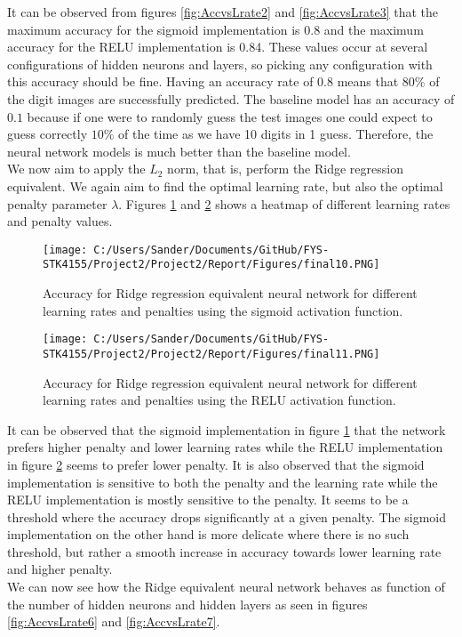 \documentclass[12pt,a4paper]{article}
\begin{document}
\noindent It can be observed from figures \ref{fig:AccvsLrate2} and \ref{fig:AccvsLrate3} that the maximum accuracy for the sigmoid implementation is 0.8 and the maximum accuracy for the RELU implementation is 0.84. These values occur at several configurations of hidden neurons and layers, so picking any configuration with this accuracy should be fine. Having an accuracy rate of 0.8 means that $80\%$ of the digit images are successfully predicted. The baseline model has an accuracy of $0.1$ because if one were to randomly guess the test images one could expect to guess correctly $10\%$ of the time as we have 10 digits in 1 guess. Therefore, the neural network models is much better than the baseline model.
\\
We now aim to apply the $L_2$ norm, that is, perform the Ridge regression equivalent. We again aim to find the optimal learning rate, but also the optimal penalty parameter $\lambda$. Figures \ref{fig:AccvsLrate4} and \ref{fig:AccvsLrate5} shows a heatmap of different learning rates and penalty values.

\begin{figure}[H]
\centering
\texttt{[image: C:/Users/Sander/Documents/GitHub/FYS-STK4155/Project2/Project2/Report/Figures/final10.PNG]}
\caption{\label{fig:AccvsLrate4} Accuracy for Ridge regression equivalent neural network for different learning rates and penalties using the sigmoid activation function.}
\end{figure}

\begin{figure}[H]
\centering
\texttt{[image: C:/Users/Sander/Documents/GitHub/FYS-STK4155/Project2/Project2/Report/Figures/final11.PNG]}
\caption{\label{fig:AccvsLrate5} Accuracy for Ridge regression equivalent neural network for different learning rates and penalties using the RELU activation function.}
\end{figure}

\noindent It can be observed that the sigmoid implementation in figure \ref{fig:AccvsLrate4} that the network prefers higher penalty and lower learning rates while the RELU implementation in figure \ref{fig:AccvsLrate5} seems to prefer lower penalty. It is also observed that the sigmoid implementation is sensitive to both the penalty and the learning rate while the RELU implementation is mostly sensitive to the penalty. It seems to be a threshold where the accuracy drops significantly at a given penalty. The sigmoid implementation on the other hand is more delicate where there is no such threshold, but rather a smooth increase in accuracy towards lower learning rate and higher penalty.
\\
We can now see how the Ridge equivalent neural network behaves as function of the number of hidden neurons and hidden layers as seen in figures \ref{fig:AccvsLrate6} and \ref{fig:AccvsLrate7}.
\end{document}
